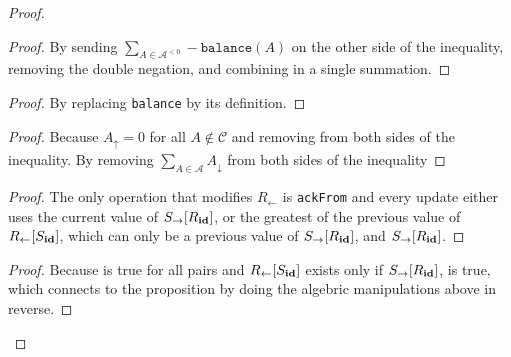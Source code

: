\documentclass[9pt, oneside]{article}   	%
\begin{document}
\begin{proof}
	\begin{proof}
		By sending  $\sum\limits_{A \in \mathcal{A}^{< 0}}  -\texttt{balance}(A)$ on the other side of the inequality, removing the double negation, and combining in a single summation.
	\end{proof}
	
	\begin{proof}
		By replacing \texttt{balance} by its definition.
	\end{proof}
	
	\begin{proof}
		Because $A_\uparrow = 0$ for all $A \notin \mathcal{C}$ and removing from both sides of the inequality. By removing $\sum\limits_{A \in \mathcal{A}} A_\downarrow$ from both sides of the inequality
	\end{proof}
	
		
	\begin{proof}
		The only operation that modifies $R_{\leftarrow}$ is \texttt{ackFrom} and every update either uses the current value of $S_{\rightarrow}[R_{\scriptsize \textbf{id}}]$, or the greatest of the previous value of  $R_{\leftarrow}[S_{\scriptsize \textbf{id}}]$, which can only be a previous value of  $S_{\rightarrow}[R_{\scriptsize \textbf{id}}]$, and $S_{\rightarrow}[R_{\scriptsize \textbf{id}}]$.
	\end{proof}
	
	\qedstep
	\begin{proof}
		Because  is true for all pairs and $R_{\leftarrow}[S_{\scriptsize \textbf{id}}]$ exists only if $S_{\rightarrow}[R_{\scriptsize \textbf{id}}]$,  is true, which connects to the proposition by doing the algebric manipulations above in reverse.
	\end{proof}
\end{proof}
\end{document}
